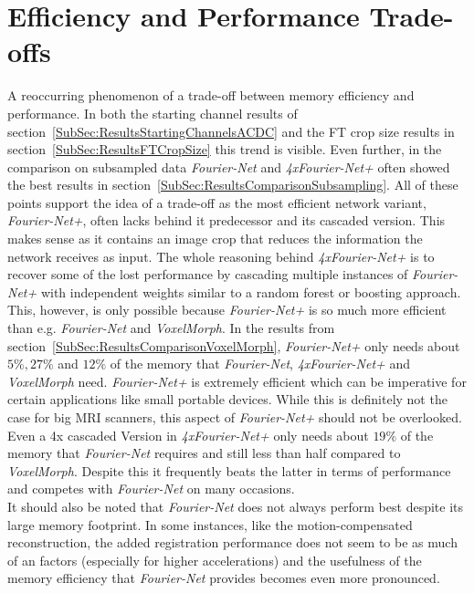 \section{Efficiency and Performance Trade-offs} \label{Sec:EfficiencyPerformanceTrade-offs}
A reoccurring phenomenon of a trade-off between memory efficiency and performance. In both the starting channel results of section~\ref{SubSec:ResultsStartingChannelsACDC} and the FT crop size results in section~\ref{SubSec:ResultsFTCropSize} this trend is visible. Even further, in the comparison on subsampled data \emph{Fourier-Net} and \emph{4xFourier-Net+} often showed the best results in section~\ref{SubSec:ResultsComparisonSubsampling}. All of these points support the idea of a trade-off as the most efficient network variant, \emph{Fourier-Net+}, often lacks behind it predecessor and its cascaded version. This makes sense as it contains an image crop that reduces the information the network receives as input. The whole reasoning behind \emph{4xFourier-Net+} is to recover some of the lost performance by cascading multiple instances of \emph{Fourier-Net+} with independent weights similar to a random forest or boosting approach.\\
This, however, is only possible because \emph{Fourier-Net+} is so much more efficient than e.g. \emph{Fourier-Net} and \emph{VoxelMorph}. In the results from section~\ref{SubSec:ResultsComparisonVoxelMorph}, \emph{Fourier-Net+} only needs about $5 \%, 27 \%$ and $12 \%$ of the memory that \emph{Fourier-Net}, \emph{4xFourier-Net+} and \emph{VoxelMorph} need. \emph{Fourier-Net+} is extremely efficient which can be imperative for certain applications like small portable devices. While this is definitely not the case for big MRI scanners, this aspect of \emph{Fourier-Net+} should not be overlooked. Even a 4x cascaded Version in \emph{4xFourier-Net+} only needs about $19 \%$ of the memory that \emph{Fourier-Net} requires and still less than half compared to \emph{VoxelMorph}. Despite this it frequently beats the latter in terms of performance and competes with \emph{Fourier-Net} on many occasions.\\
It should also be noted that \emph{Fourier-Net} does not always perform best despite its large memory footprint. In some instances, like the motion-compensated reconstruction, the added registration performance does not seem to be as much of an factors (especially for higher accelerations) and the usefulness of the memory efficiency that \emph{Fourier-Net} provides becomes even more pronounced.

